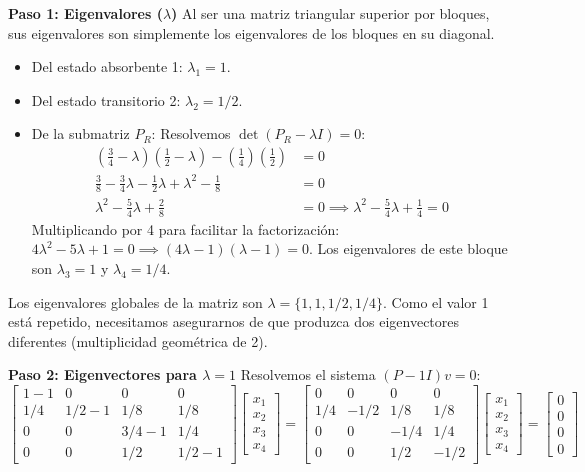\documentclass[12pt, a4paper]{article}
\begin{document}
\textbf{Paso 1: Eigenvalores ($\lambda$)}
Al ser una matriz triangular superior por bloques, sus eigenvalores son simplemente los eigenvalores de los bloques en su diagonal.
\begin{itemize}
    \item Del estado absorbente 1: $\lambda_1 = 1$.
    \item Del estado transitorio 2: $\lambda_2 = 1/2$.
    \item De la submatriz $P_R$: Resolvemos $\det(P_R - \lambda I) = 0$:
    \begin{align*}
        \left(\frac{3}{4}-\lambda\right)\left(\frac{1}{2}-\lambda\right) - \left(\frac{1}{4}\right)\left(\frac{1}{2}\right) &= 0 \\
        \frac{3}{8} - \frac{3}{4}\lambda - \frac{1}{2}\lambda + \lambda^2 - \frac{1}{8} &= 0 \\
        \lambda^2 - \frac{5}{4}\lambda + \frac{2}{8} &= 0 \implies \lambda^2 - \frac{5}{4}\lambda + \frac{1}{4} = 0
    \end{align*}
    Multiplicando por 4 para facilitar la factorización: $4\lambda^2 - 5\lambda + 1 = 0 \implies (4\lambda - 1)(\lambda - 1) = 0$.
    Los eigenvalores de este bloque son $\lambda_3 = 1$ y $\lambda_4 = 1/4$.
\end{itemize}
Los eigenvalores globales de la matriz son $\lambda = \{1, 1, 1/2, 1/4\}$. Como el valor 1 está repetido, necesitamos asegurarnos de que produzca dos eigenvectores diferentes (multiplicidad geométrica de 2).

\textbf{Paso 2: Eigenvectores para $\lambda = 1$}
Resolvemos el sistema $(P - 1 I)v = 0$:
$$ \begin{bmatrix} 1-1 & 0 & 0 & 0 \\ 1/4 & 1/2-1 & 1/8 & 1/8 \\ 0 & 0 & 3/4-1 & 1/4 \\ 0 & 0 & 1/2 & 1/2-1 \end{bmatrix} \begin{bmatrix} x_1 \\ x_2 \\ x_3 \\ x_4 \end{bmatrix} = \begin{bmatrix} 0 & 0 & 0 & 0 \\ 1/4 & -1/2 & 1/8 & 1/8 \\ 0 & 0 & -1/4 & 1/4 \\ 0 & 0 & 1/2 & -1/2 \end{bmatrix} \begin{bmatrix} x_1 \\ x_2 \\ x_3 \\ x_4 \end{bmatrix} = \begin{bmatrix} 0 \\ 0 \\ 0 \\ 0 \end{bmatrix} $$
\end{document}
